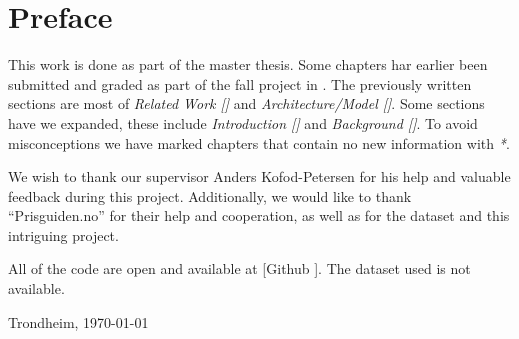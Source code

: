 \section*{Preface}



\vspace{1cm}

This work is done as part of the master thesis. Some chapters har earlier been submitted and graded
as part of the fall project in \cite{Sivertsen2021}.
The previously written sections are most of
\textit{Related Work []} and \textit{Architecture/Model []}.
Some sections have we expanded, these include \textit{Introduction [] } and
\textit{Background []}.
To avoid misconceptions we have marked chapters that contain no new
information with \textit{*}.


We wish to thank our supervisor Anders Kofod-Petersen for his help and valuable feedback during this project.
Additionally, we would like to thank ``Prisguiden.no'' for their help and cooperation,
as well as for the dataset and this intriguing project.

All of the code are open and available at [Github \cite{githubSource}]. The dataset used is not available.

\vfill

\hfill \thesisAuthor

\hfill Trondheim, \today